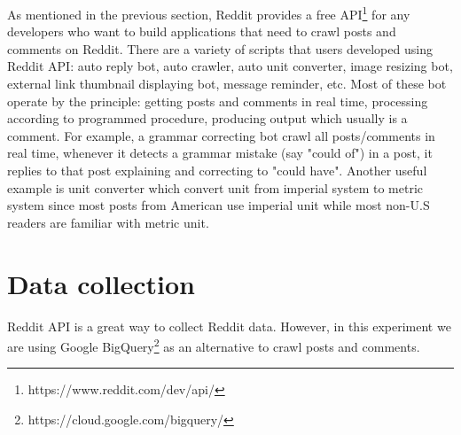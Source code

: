 As mentioned in the previous section, Reddit provides a free API\footnote{https://www.reddit.com/dev/api/} for any developers who want to build applications that need to crawl posts and comments on Reddit. There are a variety of scripts that users developed using Reddit API: auto reply bot, auto crawler, auto unit converter, image resizing bot, external link thumbnail displaying bot, message reminder, etc. Most of these bot operate by the principle: getting posts and comments in real time, processing according to programmed procedure, producing output which usually is a comment. For example, a grammar correcting bot crawl all posts/comments in real time, whenever it detects a grammar mistake (say "could of") in a post, it replies to that post explaining and correcting to "could have". Another useful example is unit converter which convert unit from imperial system to metric system since most posts from American use imperial unit while most non-U.S readers are familiar with metric unit.  
\section{Data collection}
Reddit API is a great way to collect Reddit data. However, in this experiment we are using Google BigQuery\footnote{https://cloud.google.com/bigquery/} as an alternative to crawl posts and comments. 

